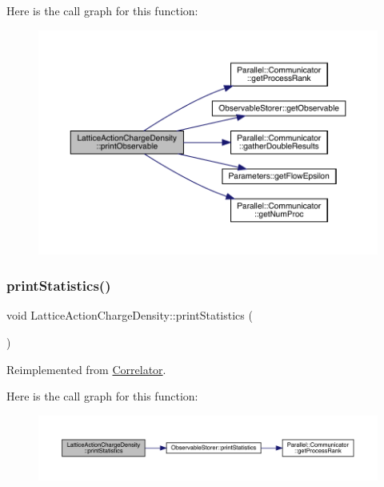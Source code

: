 Here is the call graph for this function\+:\nopagebreak
\begin{figure}[H]
\begin{center}
\leavevmode
\includegraphics[width=350pt]{class_lattice_action_charge_density_abb7db718d4069faab0ed19f31aa85ad4_cgraph}
\end{center}
\end{figure}
\mbox{\label{class_lattice_action_charge_density_abdaa497dd70dee58b810de7315241a56}} 
\subsubsection{\texorpdfstring{printStatistics()}{printStatistics()}}
{\footnotesize\ttfamily void Lattice\+Action\+Charge\+Density\+::print\+Statistics (\begin{DoxyParamCaption}{ }\end{DoxyParamCaption})\hspace{0.3cm}{\ttfamily [virtual]}}



Reimplemented from \mbox{\hyperlink{class_correlator_a2168d677f547769784781d2e2aaa53cf}{Correlator}}.

Here is the call graph for this function\+:\nopagebreak
\begin{figure}[H]
\begin{center}
\leavevmode
\includegraphics[width=350pt]{class_lattice_action_charge_density_abdaa497dd70dee58b810de7315241a56_cgraph}
\end{center}
\end{figure}
\mbox{\label{class_lattice_action_charge_density_aebbc2cc72334e7b33d9cce2ad469280b}} 
